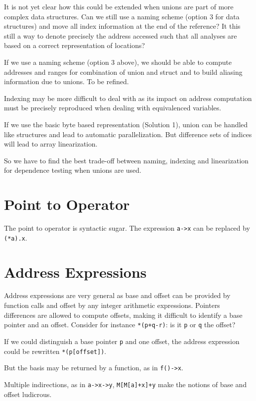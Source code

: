 \documentclass[a4paper]{report}
\begin{document}
It is not yet clear how this could be extended when unions are part of
 more complex data structures. Can we still use a naming scheme
 (option 3 for data structures) and move all index information at the
 end of the reference? It this still a way to denote precisely the
 address accessed such that all analyses are based on a correct
 representation of locations?

If we use a naming scheme (option 3 above), we should be able to
 compute addresses and ranges for combination of union and struct and
 to build aliasing information due to unions. To be refined.

Indexing may be more difficult to deal with as its impact on address
 computation must be precisely reproduced when dealing with
 equivalenced variables.

If we use the basic byte based representation (Solution 1), union can
 be handled like structures and lead to automatic parallelization. But
 difference sets of indices will lead to array linearization.

So we have to find the best trade-off between naming, indexing and
 linearization for dependence testing when unions are used.

\section{Point to Operator}

The point to operator is syntactic sugar. The expression \verb/a->x/
 can be replaced by \verb/(*a).x/.

\section{Address Expressions}

Address expressions are very general as base and offset can be
 provided by function calls and offset by any integer arithmetic
 expressions. Pointers differences are allowed to compute offsets,
 making it difficult to identify a base pointer and an
 offset. Consider for instance \verb/*(p+q-r)/: is it \verb/p/ or
 \verb/q/ the offset?

If we could distinguish a base pointer \verb/p/ and one offset, the address
 expression could be rewritten \verb/*(p[offset])/.

But the basis may be returned by a function, as in \verb/f()->x/.

Multiple indirections, as in \verb/a->x->y/, \verb/M[M[a]+x]+y/ make
 the notions of base and offset ludicrous.
\end{document}
